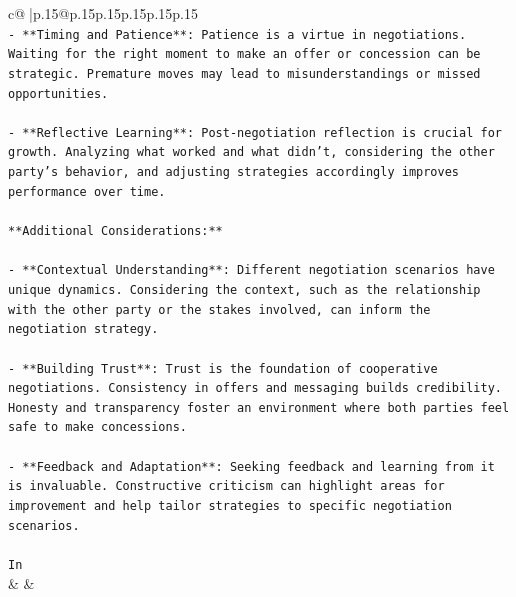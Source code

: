 \documentclass{article}
\begin{document}
{\begin{supertabular}{c@{$\;$}|p{.15\linewidth}@{}p{.15\linewidth}p{.15\linewidth}p{.15\linewidth}p{.15\linewidth}p{.15\linewidth}}
{{{\\ 
\texttt{{-} **Timing and Patience**: Patience is a virtue in negotiations. Waiting for the right moment to make an offer or concession can be strategic. Premature moves may lead to misunderstandings or missed opportunities.} \\
\\ 
\texttt{{-} **Reflective Learning**: Post{-}negotiation reflection is crucial for growth. Analyzing what worked and what didn't, considering the other party's behavior, and adjusting strategies accordingly improves performance over time.} \\
\\ 
\texttt{**Additional Considerations:**} \\
\\ 
\texttt{{-} **Contextual Understanding**: Different negotiation scenarios have unique dynamics. Considering the context, such as the relationship with the other party or the stakes involved, can inform the negotiation strategy.} \\
\\ 
\texttt{{-} **Building Trust**: Trust is the foundation of cooperative negotiations. Consistency in offers and messaging builds credibility. Honesty and transparency foster an environment where both parties feel safe to make concessions.} \\
\\ 
\texttt{{-} **Feedback and Adaptation**: Seeking feedback and learning from it is invaluable. Constructive criticism can highlight areas for improvement and help tailor strategies to specific negotiation scenarios.} \\
\\ 
\texttt{In} \\
            }
        }
    }
    & & \\ \\


\end{supertabular}}
\end{document}
